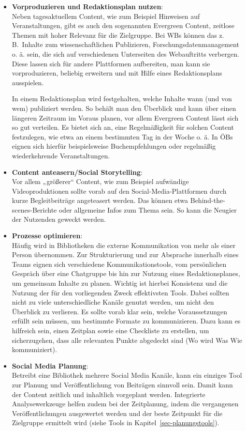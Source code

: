 \documentclass[
  11pt,
  letterpaper,
  DIV=11,
  twoside]{scrreprt}
\begin{document}
\begin{itemize}
\item
  \textbf{Vorproduzieren und Redaktionsplan nutzen}:\\
  Neben tagesaktuellem Content, wie zum Beispiel Hinweisen auf
  Veranstaltungen, gibt es auch den sogenannten Evergreen Content,
  zeitlose Themen mit hoher Relevanz für die Zielgruppe. Bei WBs können
  das z.\,B.~Inhalte zum wissenschaftlichen Publizieren,
  Forschungsdatenmanagement o. ä. sein, die sich auf verschiedenen
  Unterseiten des Webauftritts verbergen. Diese lassen sich für andere
  Plattformen aufbereiten, man kann sie vorproduzieren, beliebig
  erweitern und mit Hilfe eines Redaktionsplans ausspielen.

  In einem Redaktionsplan wird festgehalten, welche Inhalte wann (und
  von wem) publiziert werden. So behält man den Überblick und kann über
  einen längeren Zeitraum im Voraus planen, vor allem Evergreen Content
  lässt sich so gut verteilen. Es bietet sich an, eine Regelmäßigkeit
  für solchen Content festzulegen, wie etwa an einem bestimmten Tag in
  der Woche o. ä. In ÖBs eignen sich hierfür beispielsweise
  Buchempfehlungen oder regelmäßig wiederkehrende Veranstaltungen.
\item
  \textbf{Content anteasern/Social Storytelling}:\\
  Vor allem „größerer`` Content, wie zum Beispiel aufwändige
  Videoproduktionen sollte vorab auf den Social-Media-Plattformen durch
  kurze Begleitbeiträge angeteasert werden. Das können etwa
  Behind-the-scenes-Berichte oder allgemeine Infos zum Thema sein. So
  kann die Neugier der Nutzenden geweckt werden.
\item
  \textbf{Prozesse optimieren}:\\
  Häufig wird in Bibliotheken die externe Kommunikation von mehr als
  einer Person übernommen. Zur Strukturierung und zur Absprache
  innerhalb eines Teams eignen sich verschiedene Kommunikationstools,
  vom persönlichen Gespräch über eine Chatgruppe bis hin zur Nutzung
  eines Redaktionsplanes, um gemeinsam Inhalte zu planen. Wichtig ist
  hierbei Konsistenz und die Nutzung der für den vorliegenden Zweck
  effektivsten Tools. Dabei sollten nicht zu viele unterschiedliche
  Kanäle genutzt werden, um nicht den Überblick zu verlieren. Es sollte
  vorab klar sein, welche Voraussetzungen erfüllt sein müssen, um
  bestimmte Formate zu kommunizieren. Dazu kann es hilfreich sein, einen
  Zeitplan sowie eine Checkliste zu erstellen, um sicherzugehen, dass
  alle relevanten Punkte abgedeckt sind (Wo wird Was Wie kommuniziert).
\item
  \textbf{Social Media Planung}:\\
  Betreibt eine Bibliothek mehrere Social Media Kanäle, kann ein
  einziges Tool zur Planung und Veröffentlichung von Beiträgen sinnvoll
  sein. Damit kann der Content zeitlich und inhaltlich vorgeplant
  werden. Integrierte Analysewerkzeuge helfen zudem bei der Zeitplanung,
  indem die vergangenen Veröffentlichungen ausgewertet werden und der
  beste Zeitpunkt für die Zielgruppe ermittelt wird (siehe Tools in
  Kapitel~\ref{sec-planungstools}).
\end{itemize}
\end{document}
